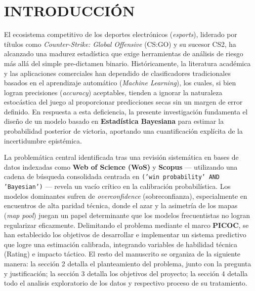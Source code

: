 \documentclass[twocolumn,10pt]{article}
\begin{document}
\thispagestyle{fancyplain} %

\section{INTRODUCCIÓN}

\justifying
El ecosistema competitivo de los deportes electrónicos (\textit{esports}), liderado por títulos como \textit{Counter-Strike: Global Offensive} (CS:GO) y su sucesor CS2, ha alcanzado una madurez estadística que exige herramientas de análisis de riesgo más allá del simple pre-dictamen binario. Históricamente, la literatura académica y las aplicaciones comerciales han dependido de clasificadores tradicionales basados en el aprendizaje automático (\textit{Machine Learning}), los cuales, si bien logran precisiones (\textit{accuracy}) aceptables, tienden a ignorar la naturaleza estocástica del juego al proporcionar predicciones secas sin un margen de error definido. En respuesta a esta deficiencia, la presente investigación fundamenta el diseño de un modelo basado en \textbf{Estadística Bayesiana} para estimar la probabilidad posterior de victoria, aportando una cuantificación explícita de la incertidumbre epistémica. 

La problemática central identificada tras una revisión sistemática en bases de datos indexadas como \textbf{Web of Science (WoS)} y \textbf{Scopus} — utilizando una cadena de búsqueda consolidada centrada en \texttt{('win probability' AND 'Bayesian')} — revela un vacío crítico en la calibración probabilística. Los modelos dominantes sufren de \textit{overconfidence} (sobreconfianza), especialmente en encuentros de alta paridad técnica, donde el azar y la asimetría de los mapas (\textit{map pool}) juegan un papel determinante que los modelos frecuentistas no logran regularizar eficazmente. Delimitando el problema mediante el marco \textbf{PICOC}, se han establecido los objetivos de desarrollar e implementar un sistema predictivo que logre una estimación calibrada, integrando variables de habilidad técnica (Rating) e impacto táctico. El resto del manuscrito se organiza de la siguiente manera: la sección 2 detalla el planteamiento del problema, junto con la pregunta y justificación; la sección 3 detalla los objetivos del proyecto; la sección 4 detalla todo el analisis exploratorio de los datos y respectivo proceso de su tratamiento.
\end{document}
